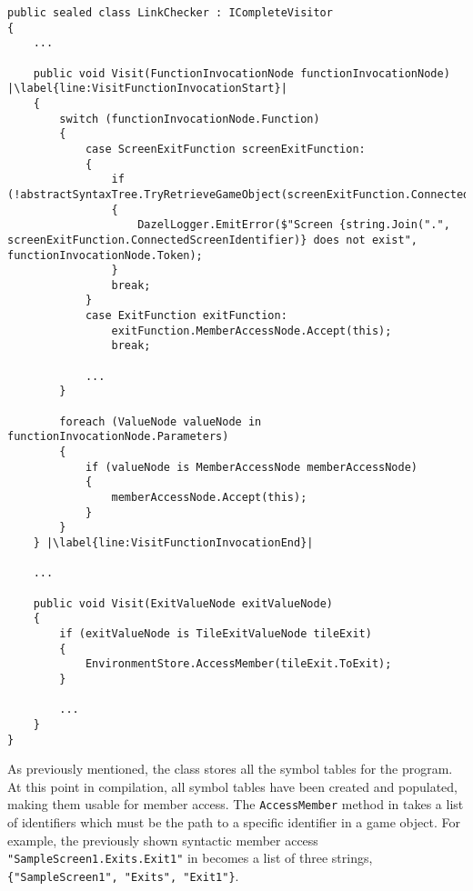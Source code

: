 \begin{lstlisting}[language=CSharp, caption={The \textbf{LinkChecker} class.}, label={lst:LinkerClass},escapechar=|]
public sealed class LinkChecker : ICompleteVisitor
{
	... 

	public void Visit(FunctionInvocationNode functionInvocationNode) |\label{line:VisitFunctionInvocationStart}|
	{
		switch (functionInvocationNode.Function) 
		{
			case ScreenExitFunction screenExitFunction:
			{
				if (!abstractSyntaxTree.TryRetrieveGameObject(screenExitFunction.ConnectedScreenIdentifier))
				{
					DazelLogger.EmitError($"Screen {string.Join(".", screenExitFunction.ConnectedScreenIdentifier)} does not exist", functionInvocationNode.Token);
				}
				break;
			}
			case ExitFunction exitFunction:
				exitFunction.MemberAccessNode.Accept(this);
				break;
			
			...
		}

		foreach (ValueNode valueNode in functionInvocationNode.Parameters)
		{
			if (valueNode is MemberAccessNode memberAccessNode)
			{
				memberAccessNode.Accept(this);
			}
		}
	} |\label{line:VisitFunctionInvocationEnd}|

	...

	public void Visit(ExitValueNode exitValueNode)
	{
		if (exitValueNode is TileExitValueNode tileExit)
		{
			EnvironmentStore.AccessMember(tileExit.ToExit);
		} 

		...
	}	
}
\end{lstlisting}

As previously mentioned, the \abstractsemanticclass{} class stores all the symbol tables for the program. 
At this point in compilation, all symbol tables have been created and populated, making them usable for member access.
The \texttt{AccessMember} method in  takes a list of identifiers which must be the path to a specific identifier in a game object.
For example, the previously shown syntactic member access \texttt{"SampleScreen1.Exits.Exit1"} in  becomes a list of three strings, 
\texttt{\{"SampleScreen1", "Exits", "Exit1"\}}.

